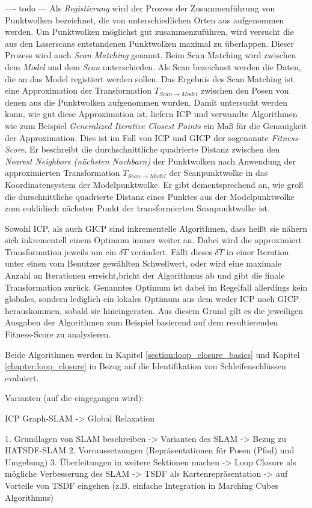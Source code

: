 ---- todo ---
Als \emph{Registierung} wird der Prozess der Zusammenführung von Punktwolken bezeichnet, die von unterschiedlichen Orten aus aufgenommen werden. Um Punktwolken möglichst gut zusammenzuführen, wird versucht die aus den Laserscans entstandenen Punktwolken maximal zu überlappen. Dieser Prozess wird auch \emph{Scan Matching} genannt.
Beim Scan Matching wird zwischen dem \emph{Model} und dem \emph{Scan} unterschieden.
Als Scan bezeichnet werden die Daten, die an das Model registiert werden sollen.
Das Ergebnis des Scan Matching ist eine Approximation der Transformation $T_{Scan \rightarrow Model}$ zwischen den Posen von denen aus die Punktwolken aufgenommen wurden.
Damit untersucht werden kann, wie gut diese Approximation ist, liefern ICP und verwandte Algorithmen wie zum Beispiel \emph{Generalized Iterative Closest Points} \cite{segal2009generalized} ein Maß für die Genauigkeit der Approximation. Dies ist im Fall von ICP und GICP der sogenannte \emph{Fitness-Score}. Er beschreibt die durchschnittliche quadrierte Distanz zwischen den \emph{Nearest Neighbors (nächsten Nachbarn)} der Punktwolken nach Anwendung der approximierten Transformation $T_{Scan \rightarrow Model}$ der Scanpunktwolke in das Koordinatensystem der Modelpunktwolke.
Er gibt dementsprechend an, wie groß die durschnittliche quadrierte Distanz eines Punktes aus der Modelpunktwolke zum euklidisch nächsten Punkt der transformierten Scanpunktwolke ist.

Sowohl ICP, als auch GICP sind inkrementelle Algorithmen, dass heißt sie nähern sich inkrementell einem Optimum immer weiter an. Dabei wird die approximiert Transformation jeweils um ein $\delta T$ verändert. Fällt dieses $\delta T$ in einer Iteration unter einen vom Benutzer gewählten Schwellwert, oder wird eine maximale Anzahl an Iterationen erreicht,bricht der Algorithmus ab und gibt die finale Transformation zurück.
Genanntes Optimum ist dabei im Regelfall allerdings kein globales, sondern lediglich ein lokales Optimum aus dem weder ICP noch GICP herauskommen, sobald sie hineingeraten.
Aus diesem Grund gilt es die jeweiligen Ausgaben der Algorithmen zum Beispiel basierend auf dem resultierenden Fitness-Score zu analysieren. 

Beide Algorithmen werden in Kapitel \ref{section:loop_closure_basics} und Kapitel \ref{chapter:loop_closure} in Bezug auf die Identifikation von Schleifenschlüssen evaluiert.


Varianten (auf die eingegangen wird): 

ICP
Graph-SLAM -> Global Relaxation


 

1. Grundlagen von SLAM beschreiben
-> Varianten des SLAM
-> Bezug zu HATSDF-SLAM
2. Vorraussetzungen (Repräsentationen für Posen (Pfad) und Umgebung)
3. Überleitungen in weitere Sektionen machen
	-> Loop Closure als mögliche Verbesserung des SLAM
	-> TSDF als Kartenrepräsentation
		-> auf Vorteile von TSDF eingehen (z.B. einfache Integration in Marching Cubes Algorithmus)